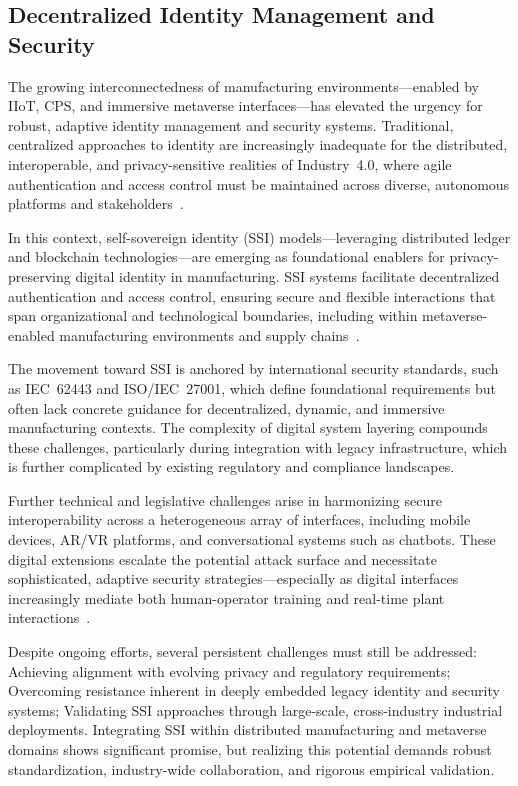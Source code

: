 \documentclass[sigconf]{acmart}
\begin{document}
\subsection{Decentralized Identity Management and Security}

The growing interconnectedness of manufacturing environments—enabled by IIoT, CPS, and immersive metaverse interfaces—has elevated the urgency for robust, adaptive identity management and security systems. Traditional, centralized approaches to identity are increasingly inadequate for the distributed, interoperable, and privacy-sensitive realities of Industry~4.0, where agile authentication and access control must be maintained across diverse, autonomous platforms and stakeholders~\cite{ref16,ref17,ref18,ref19,ref20,ref27,ref29,ref30,ref37,ref38,ref42,ref43,ref44}.

In this context, self-sovereign identity (SSI) models—leveraging distributed ledger and blockchain technologies—are emerging as foundational enablers for privacy-preserving digital identity in manufacturing. SSI systems facilitate decentralized authentication and access control, ensuring secure and flexible interactions that span organizational and technological boundaries, including within metaverse-enabled manufacturing environments and supply chains~\cite{ref92}.

The movement toward SSI is anchored by international security standards, such as IEC~62443 and ISO/IEC~27001, which define foundational requirements but often lack concrete guidance for decentralized, dynamic, and immersive manufacturing contexts. The complexity of digital system layering compounds these challenges, particularly during integration with legacy infrastructure, which is further complicated by existing regulatory and compliance landscapes. 

Further technical and legislative challenges arise in harmonizing secure interoperability across a heterogeneous array of interfaces, including mobile devices, AR/VR platforms, and conversational systems such as chatbots. These digital extensions escalate the potential attack surface and necessitate sophisticated, adaptive security strategies—especially as digital interfaces increasingly mediate both human-operator training and real-time plant interactions~\cite{ref37,ref42,ref57}.

Despite ongoing efforts, several persistent challenges must still be addressed:
Achieving alignment with evolving privacy and regulatory requirements;
Overcoming resistance inherent in deeply embedded legacy identity and security systems;
Validating SSI approaches through large-scale, cross-industry industrial deployments.
Integrating SSI within distributed manufacturing and metaverse domains shows significant promise, but realizing this potential demands robust standardization, industry-wide collaboration, and rigorous empirical validation.
\end{document}

